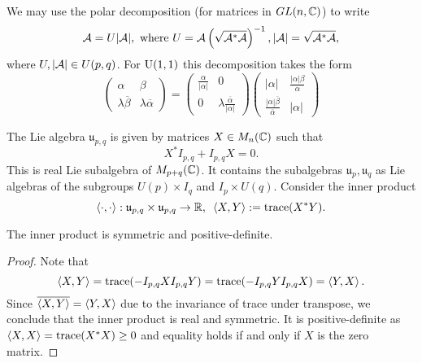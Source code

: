 \hf We may use the polar decomposition (for matrices in $GL(n,\mathbb{C})$) to write
\begin{displaymath}
    \mathcal{A}=U |\mathcal{A}|,\,\,\textup{where}\,\,U=\mathcal{A}\left(\sqrt{\mathcal{A}^\ast\mathcal{A}}\right)^{-1}, |\mathcal{A}|=\sqrt{\mathcal{A}^\ast\mathcal{A}},
\end{displaymath}
where $U,|\mathcal{A}|\in U(p,q)$. For $\textup{U}(1,1)$ this decomposition takes the form
\begin{displaymath}
    \left(\begin{array}{cc}
        \alpha & \beta\\
        \lambda \overline{\beta} & \lambda \overline{\alpha}
        \end{array}\right)=\left(\begin{array}{cc}
        \frac{\alpha}{|\alpha|} & 0\\
        0  & \lambda \frac{\overline{\alpha}}{|\alpha|}
        \end{array}\right)\left(\begin{array}{cc}
        |\alpha| & \frac{|\alpha|\beta}{\alpha}\\
        \frac{|\alpha| \overline{\beta}}{\overline{\alpha}} & |\alpha|
    \end{array}\right)
\end{displaymath}

\hf The Lie algebra $\mathfrak{u}_{p,q}$ is given by matrices $X\in M_n(\mathbb{C})$ such that
\begin{displaymath}
    X^\ast I_{p,q}+I_{p,q}X=0.
\end{displaymath}
This is real Lie subalgebra of $M_{p+q}(\mathbb{C})$. It contains the subalgebras $\mathfrak{u}_p, \mathfrak{u}_q$ as Lie algebras of the subgroups $U(p)\times I_q$ and $I_p \times U(q)$. Consider the inner product 
\begin{displaymath}
    \left\langle \cdot,\cdot\right\rangle:\mathfrak{u}_{p,q}\times \mathfrak{u}_{p,q}\to\mathbb{R},\,\,\,\left\langle X,Y\right\rangle:=\textup{trace}(X^\ast Y).
\end{displaymath}

\begin{lemma}
    The inner product is symmetric and positive-definite. 
\end{lemma}
\begin{proof}
    Note that 
    \begin{displaymath}
        \left\langle X,Y\right\rangle=\textup{trace}(-I_{p,q}XI_{p,q}Y)=\textup{trace}(-I_{p,q}YI_{p,q}X)=\left\langle Y,X\right\rangle.
    \end{displaymath}
    Since $\overline{\left\langle X,Y\right\rangle}=\left\langle Y,X\right\rangle$ due to the invariance of trace under transpose, we conclude that the inner product is real and symmetric. It is positive-definite as $\left\langle X,X\right\rangle=\textup{trace}(X^\ast X)\geq 0$ and equality holds if and only if $X$ is the zero matrix. 
\end{proof}

